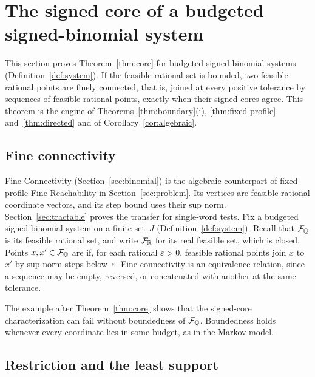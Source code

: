 
%
\section{The signed core of a budgeted signed-binomial system}\label{sec:core}

This section proves Theorem~\ref{thm:core} for budgeted signed-binomial
systems (Definition~\ref{def:system}). If the feasible rational set is
bounded, two feasible rational points are finely connected, that is,
joined at every positive tolerance by sequences of feasible rational
points, exactly when their signed cores agree. This theorem is the engine of
Theorems~\ref{thm:boundary}(i), \ref{thm:fixed-profile}
and~\ref{thm:directed} and of Corollary~\ref{cor:algebraic}.

\subsection{Fine connectivity}\label{sec:fine-connectivity}

Fine Connectivity (Section~\ref{sec:binomial}) is the algebraic counterpart
of fixed-profile Fine Reachability in Section~\ref{sec:problem}. Its
vertices are feasible rational coordinate vectors, and its step bound uses
their sup norm. Section~\ref{sec:tractable} proves the transfer for
single-word tests. Fix a budgeted signed-binomial system on a finite
set~$J$ (Definition~\ref{def:system}). Recall that $\mathcal F_{\mathbb{Q}}$ is its feasible
rational set, and write $\mathcal F_{\mathbb{R}}$ for its real feasible set, which is closed.
Points $x,x'\in\mathcal F_{\mathbb{Q}}$ are  if, for each rational
$\varepsilon>0$, feasible rational points join $x$ to $x'$ by sup-norm
steps below~$\varepsilon$. Fine connectivity is an equivalence relation,
since a sequence may be empty, reversed, or concatenated with another at
the same tolerance.

The example after Theorem~\ref{thm:core} shows that the signed-core
characterization can fail without boundedness of $\mathcal F_{\mathbb{Q}}$. Boundedness holds whenever every
coordinate lies in some budget, as in the Markov model.

\subsection{Restriction and the least support}\label{sec:restriction}

